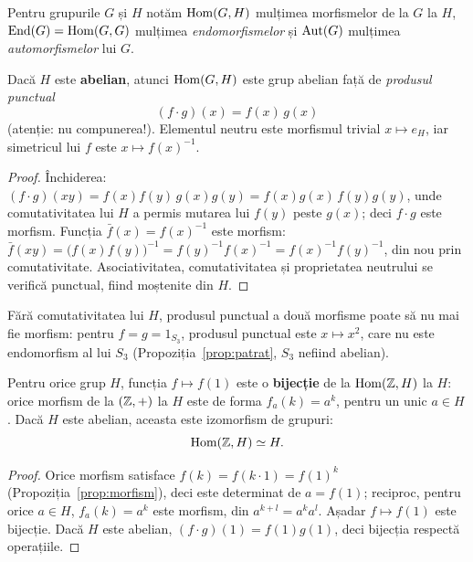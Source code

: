 \begin{definitie}
Pentru grupurile $G$ și $H$ notăm $\operatorname{Hom}(G,H)$ mulțimea morfismelor de la $G$ la $H$, $\operatorname{End}(G)=\operatorname{Hom}(G,G)$ mulțimea \emph{endomorfismelor} și $\operatorname{Aut}(G)$ mulțimea \emph{automorfismelor} lui $G$.
\end{definitie}

\begin{propozitie}\label{prop:homgrup}
Dacă $H$ este \textbf{abelian}, atunci $\operatorname{Hom}(G,H)$ este grup abelian față de \emph{produsul punctual}
\[
(f\cdot g)(x)=f(x)\,g(x)
\]
(atenție: nu compunerea!). Elementul neutru este morfismul trivial $x\mapsto e_H$, iar simetricul lui $f$ este $x\mapsto f(x)^{-1}$.
\end{propozitie}

\begin{proof}
Închiderea: $(f\cdot g)(xy)=f(x)f(y)\,g(x)g(y)=f(x)g(x)\,f(y)g(y)$, unde comutativitatea lui $H$ a permis mutarea lui $f(y)$ peste $g(x)$; deci $f\cdot g$ este morfism. Funcția $\bar f(x)=f(x)^{-1}$ este morfism: $\bar f(xy)=\bigl(f(x)f(y)\bigr)^{-1}=f(y)^{-1}f(x)^{-1}=f(x)^{-1}f(y)^{-1}$, din nou prin comutativitate. Asociativitatea, comutativitatea și proprietatea neutrului se verifică punctual, fiind moștenite din $H$.
\end{proof}

\begin{observatie}
Fără comutativitatea lui $H$, produsul punctual a două morfisme poate să nu mai fie morfism: pentru $f=g=1_{S_3}$, produsul punctual este $x\mapsto x^2$, care nu este endomorfism al lui $S_3$ (Propoziția~\ref{prop:patrat}, $S_3$ nefiind abelian).
\end{observatie}

\begin{propozitie}[{$\Hom(\ZZ,H)$}]\label{prop:homZ}
Pentru orice grup $H$, funcția $f\mapsto f(1)$ este o \textbf{bijecție} de la $\Hom(\ZZ,H)$ la $H$: orice morfism de la $(\mathbb{Z},+)$ la $H$ este de forma $f_a(k)=a^k$, pentru un unic $a\in H$. Dacă $H$ este abelian, aceasta este izomorfism de grupuri:
\[
\operatorname{Hom}(\mathbb{Z},H)\simeq H.
\]
\end{propozitie}

\begin{proof}
Orice morfism satisface $f(k)=f(k\cdot 1)=f(1)^k$ (Propoziția~\ref{prop:morfism}), deci este determinat de $a=f(1)$; reciproc, pentru orice $a\in H$, $f_a(k)=a^k$ este morfism, din $a^{k+l}=a^ka^l$. Așadar $f\mapsto f(1)$ este bijecție. Dacă $H$ este abelian, $(f\cdot g)(1)=f(1)g(1)$, deci bijecția respectă operațiile.
\end{proof}

